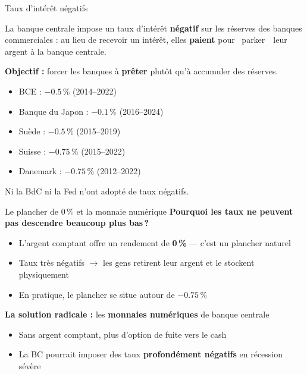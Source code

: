 \documentclass[aspectratio=169]{beamer}
\begin{document}
\begin{frame}[t]{Taux d'intérêt négatifs}\examtag
   \small
   \begin{defbox}
      La banque centrale impose un taux d'intérêt \textbf{négatif} sur les réserves des banques commerciales : au lieu de recevoir un intérêt, elles \textbf{paient} pour \guillemotleft~parker~\guillemotright~leur argent à la banque centrale.
   \end{defbox}
   \vspace{0.1cm}
   \textbf{Objectif :} forcer les banques à \textbf{prêter} plutôt qu'à accumuler des réserves.
   \vspace{0.1cm}
   \footnotesize
   \begin{itemize}
      \setlength\itemsep{0.05cm}
      \item BCE : $-0.5\,\%$ (2014--2022)
      \item Banque du Japon : $-0.1\,\%$ (2016--2024)
      \item Suède : $-0.5\,\%$ (2015--2019)
      \item Suisse : $-0.75\,\%$ (2015--2022)
      \item Danemark : $-0.75\,\%$ (2012--2022)
   \end{itemize}
   \vspace{0.05cm}
   {\scriptsize\textcolor{HECgray}{Ni la BdC ni la Fed n'ont adopté de taux négatifs.}}
\end{frame}

\begin{frame}[t]{Le plancher de 0\,\% et la monnaie numérique}
   \small
   \vspace{0.2cm}
   \textbf{Pourquoi les taux ne peuvent pas descendre beaucoup plus bas\,?}
   \vspace{0.2cm}
   \begin{itemize}
      \setlength\itemsep{0.2cm}
      \item L'argent comptant offre un rendement de \textbf{0\,\%} --- c'est un plancher naturel
      \item Taux très négatifs $\to$ les gens retirent leur argent et le stockent physiquement
      \item En pratique, le plancher se situe autour de $-0.75\,\%$
   \end{itemize}
   \vspace{0.3cm}
   \textbf{La solution radicale :} les \textbf{monnaies numériques} de banque centrale
   \vspace{0.2cm}
   \begin{itemize}
      \setlength\itemsep{0.2cm}
      \item Sans argent comptant, plus d'option de fuite vers le cash
      \item La BC pourrait imposer des taux \textbf{profondément négatifs} en récession sévère
   \end{itemize}
\end{frame}
\end{document}
